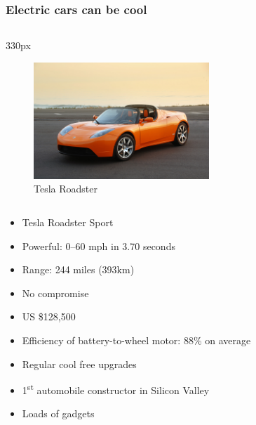 {
\logo{}
\begin{frame}
\frametitle{Electric cars can be cool}
\begin{center}
\begin{columns}
\begin{column}{330px}
{
    \begin{figure}[h!]
        \centering
        \includegraphics[width=250px]
            {images/tesla-roadster.jpg}
        \caption{Tesla Roadster}
    \end{figure}
}
\end{column}
\end{columns}
\end{center}
\end{frame}
}

\begin{frame}
\begin{itemize}
    \itemsep1.5em
    \item Tesla Roadster Sport
    \item Powerful: 0--60 mph in 3.70 seconds
    \item Range: 244 miles (393km)
    \item No compromise
    \item US \$128,500
\end{itemize}
\end{frame}

\begin{frame}
\begin{itemize}
    \itemsep1.5em
    \item Efficiency of battery-to-wheel motor: 88\% on average
    \item Regular cool free upgrades
    \item 1\textsuperscript{st} automobile constructor in Silicon Valley
    \item Loads of gadgets
\end{itemize}
\end{frame}

